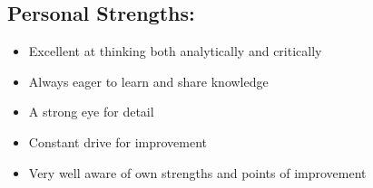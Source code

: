 \documentclass[a4paper,10pt]{article}
\begin{document}
\subsection{Personal Strengths:}
\begin{itemize}
\item Excellent at thinking both analytically and critically
\item Always eager to learn and share knowledge
\item A strong eye for detail
\item Constant drive for improvement
\item Very well aware of own strengths and points of improvement
\end{itemize}
\end{document}
